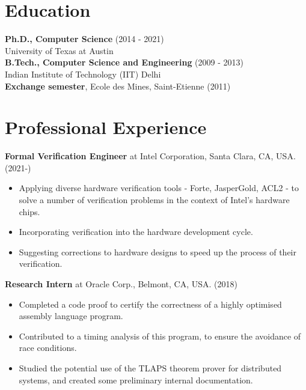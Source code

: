 \documentclass[margin]{res}
\begin{document}

\address{Intel Corporation}

\address{+1 512-952-0104 \\ \url{www.cs.utexas.edu/~mihir} }


\begin{resume}


\section{Education}
{\bf Ph.D., Computer Science} \hfill (2014 - 2021)\\
University of Texas at Austin\\
{\bf B.Tech., Computer Science and Engineering} \hfill (2009 - 2013)\\
Indian Institute of Technology (IIT) Delhi\\
{\bf Exchange semester}, Ecole des Mines, Saint-Etienne \hfill (2011)

\section{Professional Experience}

 {\bf Formal Verification Engineer} at Intel Corporation, Santa Clara,
 CA, USA. \hfill (2021-)
 \begin{itemize} \itemsep -2pt  %
 \item Applying diverse hardware verification tools - Forte,
   JasperGold, ACL2 - to solve a number of verification problems in
   the context of Intel's hardware chips.
 \item Incorporating verification into the hardware development cycle.
 \item Suggesting corrections to hardware designs to speed up the
   process of their verification.
 \end{itemize}

 {\bf Research Intern} at Oracle Corp., Belmont, CA, USA. \hfill (2018)
 \begin{itemize} \itemsep -2pt  %
 \item Completed a code proof to certify the correctness of a highly
   optimised assembly language program.
 \item Contributed to a timing analysis of this program, to ensure the
   avoidance of race conditions.
 \item Studied the potential use of the TLAPS theorem prover for
   distributed systems, and created some preliminary internal
   documentation.
 \end{itemize}


\end{resume}
\end{document}
